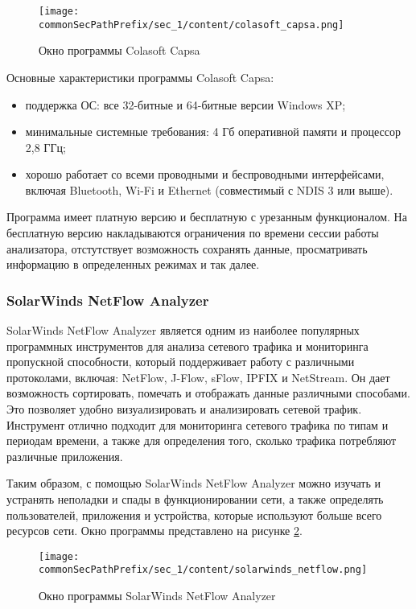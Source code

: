 \begin{figure}[h!]
    \centering
    \texttt{[image: \\commonSecPathPrefix/sec\_1/content/colasoft\_capsa.png]}
    \caption{Окно программы Colasoft Capsa}
    \label{fig:colasoft}
\end{figure}

Основные характеристики программы Colasoft Capsa:
\begin{itemize}
    \item поддержка ОС: все 32-битные и 64-битные версии Windows XP;
    \item минимальные системные требования: 4 Гб оперативной памяти и
    процессор 2,8 ГГц;
    \item хорошо работает со всеми проводными и беспроводными интерфейсами,
    включая Bluetooth, Wi-Fi и Ethernet (совместимый с NDIS 3 или выше).
\end{itemize}

Программа имеет платную версию и бесплатную с урезанным функционалом. На бесплатную 
версию накладываются ограничения по времени сессии работы анализатора, отстутствует
возможность сохранять данные, просматривать информацию в определенных режимах и так далее.


\subsubsection{SolarWinds NetFlow Analyzer}

SolarWinds NetFlow Analyzer является одним из наиболее популярных
программных инструментов для анализа сетевого трафика и мониторинга
пропускной способности, который поддерживает работу с различными
протоколами, включая: NetFlow, J-Flow, sFlow, IPFIX и NetStream. Он дает
возможность сортировать, помечать и отображать данные различными
способами. Это позволяет удобно визуализировать и анализировать сетевой
трафик. Инструмент отлично подходит для мониторинга сетевого трафика по
типам и периодам времени, а также для определения того, сколько трафика
потребляют различные приложения.


Таким образом, с помощью SolarWinds NetFlow Analyzer можно
изучать и устранять неполадки и спады в функционировании сети, а также
определять пользователей, приложения и устройства, которые используют
больше всего ресурсов сети. Окно программы представлено на рисунке \ref{fig:solarwinds}.

\begin{figure}[h!]
    \centering
    \texttt{[image: \\commonSecPathPrefix/sec\_1/content/solarwinds\_netflow.png]}
    \caption{Окно программы SolarWinds NetFlow Analyzer}
    \label{fig:solarwinds}
\end{figure}

